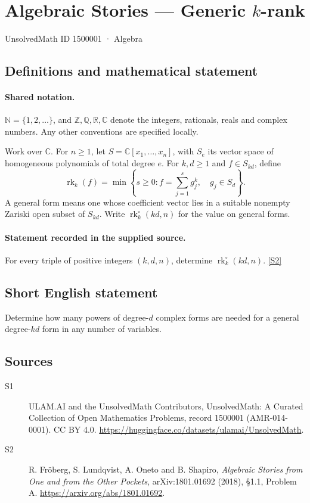 \documentclass[11pt]{article}
\newcommand{\sref}[2]{\hyperlink{source:#1:#2}{[S#2]}}
\begin{document}
\setcounter{section}{1500000}
\section{Algebraic Stories — Generic $k$-rank}\label{1500001}
{\small\sffamily UnsolvedMath ID 1500001 · Algebra}
\subsection{Definitions and mathematical statement}

\paragraph{Shared notation.}$\mathbb N=\{1,2,\ldots\}$, and $\mathbb Z,\mathbb Q,\mathbb R,\mathbb C$ denote the integers, rationals, reals and complex numbers. Any other conventions are specified locally.


Work over $\mathbb C$. For $n\geq1$, let $S=\mathbb C[x_1,\ldots,x_n]$, with $S_e$ its vector space of homogeneous polynomials of total degree $e$. For $k,d\geq1$ and $f\in S_{kd}$, define
\[\operatorname{rk}_k(f)=\min\left\{s\geq0:f=\sum_{j=1}^{s}g_j^k,\quad g_j\in S_d\right\}.
\]
A general form means one whose coefficient vector lies in a suitable nonempty Zariski open subset of $S_{kd}$. Write $\operatorname{rk}_k^\circ(kd,n)$ for the value on general forms.
\paragraph{Statement recorded in the supplied source.}
For every triple of positive integers $(k,d,n)$, determine $\operatorname{rk}_k^\circ(kd,n)$. \sref{1500001}{2}
\subsection{Short English statement}
Determine how many powers of degree-$d$ complex forms are needed for a general degree-$kd$ form in any number of variables.
\subsection{Sources}
\begin{description}
\item[\hypertarget{source:1500001:1}{S1}] ULAM.AI and the UnsolvedMath Contributors, UnsolvedMath: A Curated Collection of Open Mathematics Problems, record 1500001 (AMR-014-0001). CC BY 4.0. \url{https://huggingface.co/datasets/ulamai/UnsolvedMath}.
\item[\hypertarget{source:1500001:2}{S2}] R. Fröberg, S. Lundqvist, A. Oneto and B. Shapiro, \emph{Algebraic Stories from One and from the Other Pockets}, arXiv:1801.01692 (2018), §1.1, Problem A. \url{https://arxiv.org/abs/1801.01692}.
\end{description}
\label{end:1500001}
\end{document}
